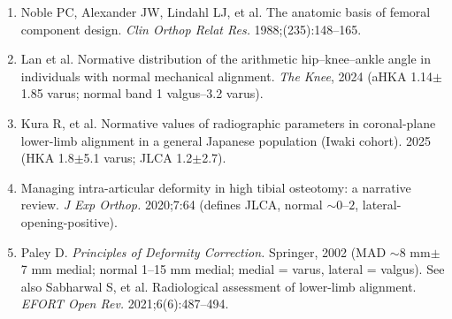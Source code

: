 \documentclass[10pt]{article}
\begin{document}
\begin{enumerate}[leftmargin=2em,itemsep=2pt]
        center-edge angle and Lequesne's acetabular index --- a coxometric update.
        \emph{Skeletal Radiol.} 2012;41(11):1273--1282. (Original: Wiberg G. \emph{Acta Chir
        Scand.} 1939.)
  \item Noble PC, Alexander JW, Lindahl LJ, et al. The anatomic basis of femoral component
        design. \emph{Clin Orthop Relat Res.} 1988;(235):148--165.
  \item Lan et al. Normative distribution of the arithmetic hip--knee--ankle angle in
        individuals with normal mechanical alignment. \emph{The Knee}, 2024 (aHKA
        1.14\textdegree{}$\pm$1.85\textdegree{} varus; normal band 1\textdegree{}
        valgus--3.2\textdegree{} varus).
  \item Kura R, et al. Normative values of radiographic parameters in coronal-plane
        lower-limb alignment in a general Japanese population (Iwaki cohort). 2025 (HKA
        1.8\textdegree{}$\pm$5.1\textdegree{} varus; JLCA 1.2\textdegree{}$\pm$2.7\textdegree{}).
  \item Managing intra-articular deformity in high tibial osteotomy: a narrative review.
        \emph{J Exp Orthop.} 2020;7:64 (defines JLCA, normal ${\sim}0\text{--}2$\textdegree{},
        lateral-opening-positive).
  \item Paley D. \emph{Principles of Deformity Correction.} Springer, 2002 (MAD
        ${\sim}8$ mm$\pm$7 mm medial; normal 1--15 mm medial; medial = varus, lateral =
        valgus). See also Sabharwal S, et al. Radiological assessment of lower-limb
        alignment. \emph{EFORT Open Rev.} 2021;6(6):487--494.
\end{enumerate}
\end{document}
